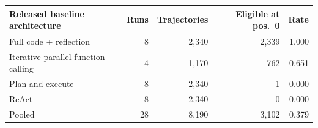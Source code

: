 \begin{tabular}{@{}lrrrr@{}}
\toprule
Released baseline architecture & Runs & Trajectories & Eligible at pos.~0 & Rate \\
\midrule
Full code + reflection                & 8 & 2{,}340 & 2{,}339 & 1.000 \\
Iterative parallel function calling   & 4 & 1{,}170 &    762 & 0.651 \\
Plan and execute                      & 8 & 2{,}340 &      1 & 0.000 \\
ReAct                                 & 8 & 2{,}340 &      0 & 0.000 \\
\midrule
Pooled                                & 28 & 8{,}190 & 3{,}102 & 0.379 \\
\bottomrule
\end{tabular}
